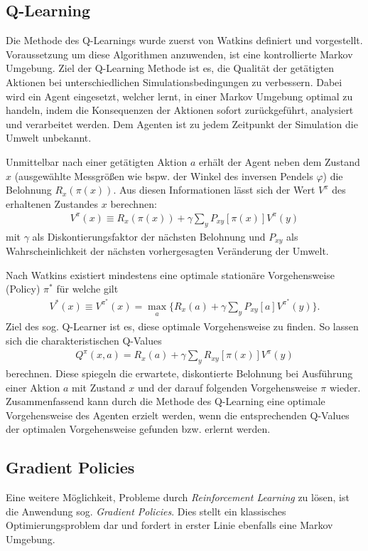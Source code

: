 	\subsection{Q-Learning}
	\label{subsec:rl_qlearning}
		Die Methode des Q-Learnings wurde zuerst von Watkins \cite{Watkins1992} definiert und vorgestellt. Voraussetzung um diese Algorithmen anzuwenden, ist eine kontrollierte Markov Umgebung. Ziel der Q-Learning Methode ist es, die Qualität der getätigten Aktionen bei unterschiedlichen Simulationsbedingungen zu verbessern. Dabei wird ein Agent eingesetzt, welcher lernt, in einer Markov Umgebung optimal zu handeln, indem die Konsequenzen der Aktionen sofort zurückgeführt, analysiert und verarbeitet werden. Dem Agenten ist zu jedem Zeitpunkt der Simulation die Umwelt unbekannt.
		
		Unmittelbar nach einer getätigten Aktion $a$ erhält der Agent neben dem Zustand $x$ (ausgewählte Messgrößen wie bspw. der Winkel des inversen Pendels $\varphi$) die Belohnung $R_x(\pi(x))$. Aus diesen Informationen lässt sich der Wert $V^\pi$ des erhaltenen Zustandes $x$ berechnen:
		\begin{align}
			V^\pi(x) \equiv R_x(\pi(x)) + \gamma \sum_{y}P_{xy}[\pi(x)]V^\pi(y)
		\end{align}
		mit $\gamma$ als Diskontierungsfaktor der nächsten Belohnung und $P_{xy}$ als Wahrscheinlichkeit der nächsten vorhergesagten Veränderung der Umwelt.
		
		Nach Watkins existiert mindestens eine optimale stationäre Vorgehensweise (\glqq Policy\grqq) $\pi^*$ für welche gilt
		\begin{align}
			V^*(x) \equiv V^{\pi^*}(x) = \max_{\substack{a}} \bigg\{R_x(a) + \gamma \sum_{y}P_{xy}[a]V^{\pi^*}(y)\bigg\}.
		\end{align}
		Ziel des sog. \glqq Q-Learner\grqq{} ist es, diese optimale Vorgehensweise zu finden. So lassen sich die charakteristischen Q-Values
		\begin{align}
			Q^\pi(x,a) = R_x(a) + \gamma \sum_{y}R_{xy}[\pi(x)]V^\pi(y)
		\end{align}
		berechnen. Diese spiegeln die erwartete, diskontierte Belohnung bei Ausführung einer Aktion $a$ mit Zustand $x$ und der darauf folgenden Vorgehensweise $\pi$ wieder. Zusammenfassend kann durch die Methode des Q-Learning eine optimale Vorgehensweise des Agenten erzielt werden, wenn die entsprechenden Q-Values der optimalen Vorgehensweise gefunden bzw. erlernt werden.
	
	\subsection{Gradient Policies}
		Eine weitere Möglichkeit, Probleme durch \textit{Reinforcement Learning} zu lösen, ist die Anwendung sog. \textit{Gradient Policies}. Dies stellt ein klassisches Optimierungsproblem dar und fordert in erster Linie ebenfalls eine Markov Umgebung.
		
